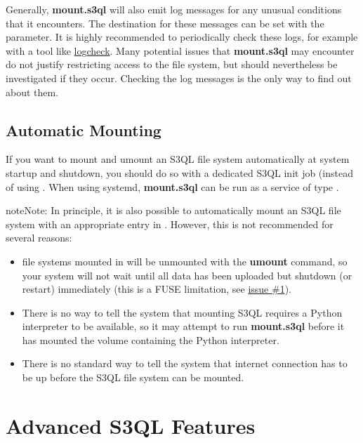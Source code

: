 \documentclass[letterpaper,10pt,english]{sphinxmanual}
\begin{document}
Generally, \textbf{mount.s3ql} will also emit log messages for any
unusual conditions that it encounters. The destination for these
messages can be set with the  parameter. It is highly
recommended to periodically check these logs, for example with a tool
like \href{http://sourceforge.net/projects/logcheck/}{logcheck}. Many potential issues that \textbf{mount.s3ql} may
encounter do not justify restricting access to the file system, but
should nevertheless be investigated if they occur. Checking the log
messages is the only way to find out about them.


\section{Automatic Mounting}
\label{mount:logcheck}\label{mount:automatic-mounting}
If you want to mount and umount an S3QL file system automatically at
system startup and shutdown, you should do so with a dedicated S3QL
init job (instead of using . When using systemd,
\textbf{mount.s3ql} can be run as a service of type .

\begin{notice}{note}{Note:}
In principle, it is also possible to automatically mount an S3QL
file system with an appropriate entry in . However,
this is not recommended for several reasons:
\begin{itemize}
\item {} 
file systems mounted in  will be unmounted with the
\textbf{umount} command, so your system will not wait until all data has
been uploaded but shutdown (or restart) immediately (this is a
FUSE limitation, see \href{https://bitbucket.org/nikratio/s3ql/issue/1/blocking-fusermount-and-umount}{issue \#1}).

\item {} 
There is no way to tell the system that mounting S3QL requires a
Python interpreter to be available, so it may attempt to run
\textbf{mount.s3ql} before it has mounted the volume containing
the Python interpreter.

\item {} 
There is no standard way to tell the system that internet
connection has to be up before the S3QL file system can be
mounted.

\end{itemize}
\end{notice}


\chapter{Advanced S3QL Features}
\label{special::doc}\label{special:advanced-s3ql-features}
\end{document}
